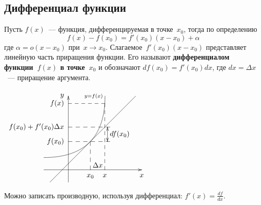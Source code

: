 \subsection{Дифференциал функции}
 Пусть $f(x)$~--- функция, дифференцируемая в точке~$x_0$, тогда по определению
\begin{equation*}
f(x) - f(x_0) = f'(x_0)(x - x_0) + \alpha
\end{equation*}
где $\alpha = o(x - x_0)$ при~$x \to x_0$.
Слагаемое~$f'(x_0)(x - x_0)$ представляет линейную часть приращения функции.
Его называют \textbf{дифференциалом функции~$f(x)$ в точке~$x_0$} и обозначают $df(x_0) = f'(x_0)dx$, где $dx = \Delta x$~--- приращение аргумента.

\begin{center}
\noindent
$\begin{xy} /r12mm/:
(-1, 0); (3, 0) **@{-} *@{>} *++!U{x};
(0, -0.5); (0, 3) **@{-} *@{>} *++!R{y};
(-1, 0.5); (1.5, 3) **\crv{(1.5, 0.5)} *+!R{\scriptstyle y = f(x)};
(-0.75, -0.5); (2.75, 3) **@{-}; %
(0.9, 1.15) = "M"; (0.9, 0) **@{--} *++!U{x_0};
(1.7, 1.15); (0, 1.15) **@{--} *++!R{f(x_0)};
(1.49, 2.7) = "X"; (1.49, 0) **@{--} *++!U{x};
"X"; (0, 2.7) **@{--} *++!R{f(x)};
(1.2, 0.2) *{\Delta x};
(1.7, 1.74); (0, 1.74) **@{--} *++!R{f(x_0) + f'(x_0) \Delta x};
(1.6, 1.74); (1.6, 1.15) **{} *@{>}; %
(1.6, 1.74) **@{-} *@{>};
(2.1, 1.45) *{df(x_0)};
\end{xy}$
\end{center}

Можно записать производную, используя дифференциал: $\displaystyle f'(x) = \frac{df}{dx}$.
